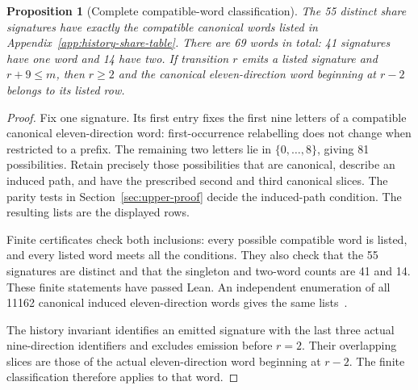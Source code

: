 \documentclass[11pt,a4paper]{article}
\newtheorem{proposition}[theorem]{Proposition}
\theoremstyle{definition}
\theoremstyle{remark}
\begin{document}
\begin{proposition}[Complete compatible-word classification]\label{prop:history-share-classification}
The 55 distinct share signatures have exactly the compatible canonical words
listed in Appendix~\ref{app:history-share-table}. There are 69 words in total:
41 signatures have one word and 14 have two. If transition $r$ emits a listed
signature and $r+9\le m$, then $r\ge2$ and the canonical eleven-direction word
beginning at $r-2$ belongs to its listed row.
\end{proposition}
\begin{proof}
Fix one signature. Its first entry fixes the first nine letters of a compatible
canonical eleven-direction word: first-occurrence relabelling does not change
when restricted to a prefix. The remaining two letters lie in
$\{0,\ldots,8\}$, giving 81 possibilities. Retain precisely those possibilities
that are canonical, describe an induced path, and have the prescribed second
and third canonical slices. The parity tests in Section~\ref{sec:upper-proof}
decide the induced-path condition. The resulting lists are the displayed rows.

Finite certificates check both inclusions: every possible compatible word is
listed, and every listed word meets all the conditions. They also check that
the 55 signatures are distinct and that the singleton and two-word counts
are 41 and 14. These finite statements have passed Lean. An independent
enumeration of all 11162 canonical induced eleven-direction words gives the
same lists~\cite{historycreditarchive}.

The history invariant identifies an emitted signature with the last three
actual nine-direction identifiers and excludes emission before $r=2$.
Their overlapping slices are those of the actual eleven-direction word
beginning at $r-2$. The finite classification therefore applies to that word.
\end{proof}
\end{document}
